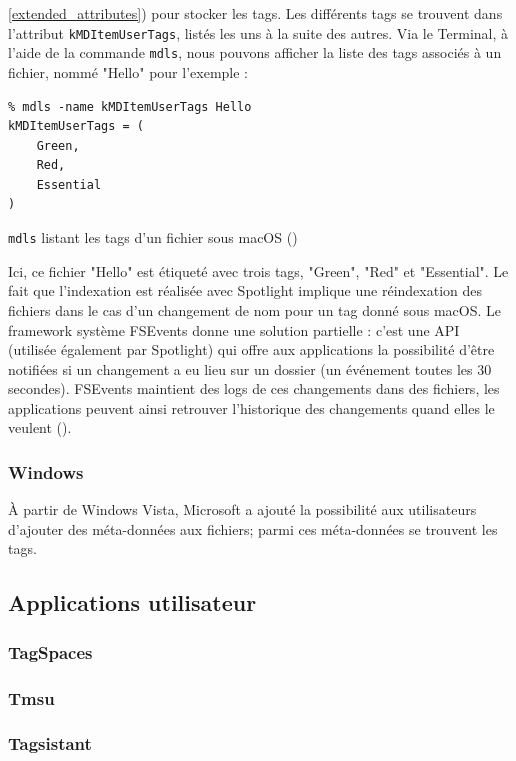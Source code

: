 \documentclass[a4paper, 12pt]{article}
\newenvironment{code}{\captionsetup{type=listing}}{}
\begin{document}
\ref{extended_attributes}) pour stocker les tags. Les différents tags se trouvent dans l'attribut 
\texttt{kMDItemUserTags}, listés les uns à la suite des autres. Via le Terminal, à 
l'aide de la commande \texttt{mdls}, nous pouvons afficher la liste des tags associés à 
un fichier, nommé "Hello" pour l'exemple :
\begin{code}
    \begin{verbatim}
% mdls -name kMDItemUserTags Hello 
kMDItemUserTags = (
    Green,
    Red,
    Essential
)
    \end{verbatim}
    \caption{\texttt{mdls} listant les tags d'un fichier sous macOS (\cite{ref7})}
\end{code}
\bigbreak
Ici, ce fichier "Hello" est étiqueté avec trois tags, "Green", "Red" et "Essential". Le fait que 
l'indexation est réalisée avec Spotlight implique une réindexation des fichiers dans le cas d'un 
changement de nom pour un tag donné sous macOS. Le framework système FSEvents donne une solution 
partielle : c'est une API (utilisée également par Spotlight) qui offre aux applications la 
possibilité d'être notifiées si un changement a eu lieu sur un dossier (un événement toutes les 
30 secondes). FSEvents maintient des logs de ces changements dans des fichiers, les applications 
peuvent ainsi retrouver l'historique des changements quand elles le veulent (\cite{ref10}).

\subsubsection{Windows}
À partir de Windows Vista, Microsoft a ajouté la possibilité aux utilisateurs d'ajouter des 
méta-données aux fichiers; parmi ces méta-données se trouvent les tags.

\subsection{Applications utilisateur}
\subsubsection{TagSpaces}
\subsubsection{Tmsu}
\subsubsection{Tagsistant}
\end{document}
